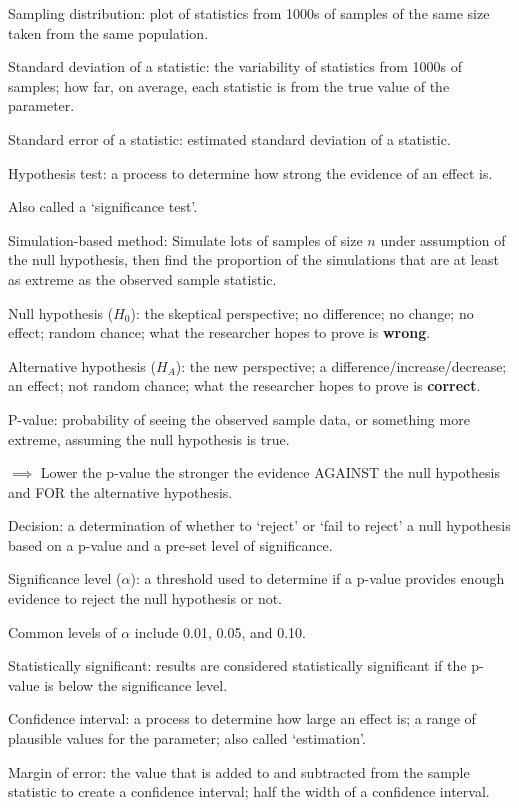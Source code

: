 \documentclass[
]{report}
\newcommand{\rgi}{\hspace{24pt}}  %
\begin{document}
Sampling distribution: plot of statistics from 1000s of samples of the same size taken from the same population.

Standard deviation of a statistic: the variability of statistics from 1000s of samples; how far, on average, each statistic is from the true value of the parameter.

Standard error of a statistic: estimated standard deviation of a statistic.

Hypothesis test: a process to determine how strong the evidence of an effect is.

\rgi Also called a `significance test'.

Simulation-based method: Simulate lots of samples of size \(n\) under assumption of the null hypothesis, then find the proportion of the simulations that are at least as extreme as the observed sample statistic.

Null hypothesis (\(H_0\)): the skeptical perspective; no difference; no change; no effect; random chance; what the researcher hopes to prove is \textbf{wrong}.

Alternative hypothesis (\(H_A\)): the new perspective; a difference/increase/decrease; an effect; not random chance; what the researcher hopes to prove is \textbf{correct}.

P-value: probability of seeing the observed sample data, or something more extreme, assuming the null hypothesis is true.

\(\implies\) Lower the p-value the stronger the evidence AGAINST the null hypothesis and FOR the alternative hypothesis.

Decision: a determination of whether to `reject' or `fail to reject' a null hypothesis based on a p-value and a pre-set level of significance.

Significance level (\(\alpha\)): a threshold used to determine if a p-value provides enough evidence to reject the null hypothesis or not.

\rgi Common levels of \(\alpha\) include 0.01, 0.05, and 0.10.

Statistically significant: results are considered statistically significant if the p-value is below the significance level.

Confidence interval: a process to determine how large an effect is; a range of plausible values for the parameter; also called `estimation'.

Margin of error: the value that is added to and subtracted from the sample statistic to create a confidence interval; half the width of a confidence interval.
\end{document}

